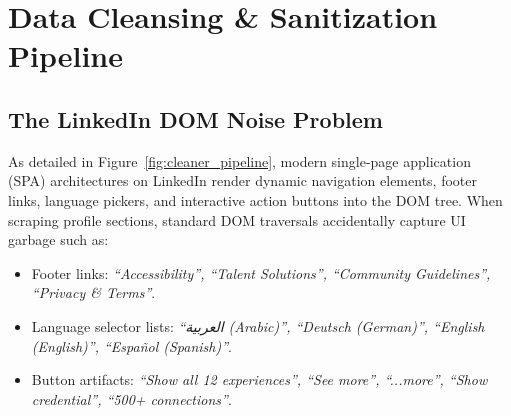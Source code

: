 \documentclass[11pt,a4paper]{report}
\begin{document}
\chapter{Data Cleansing \& Sanitization Pipeline}

\section{The LinkedIn DOM Noise Problem}
As detailed in Figure~\ref{fig:cleaner_pipeline}, modern single-page application (SPA) architectures on LinkedIn render dynamic navigation elements, footer links, language pickers, and interactive action buttons into the DOM tree. When scraping profile sections, standard DOM traversals accidentally capture UI garbage such as:
\begin{itemize}[leftmargin=*]
    \item Footer links: \textit{``Accessibility'', ``Talent Solutions'', ``Community Guidelines'', ``Privacy \& Terms''}.
    \item Language selector lists: \textit{``العربية (Arabic)'', ``Deutsch (German)'', ``English (English)'', ``Español (Spanish)''}.
    \item Button artifacts: \textit{``Show all 12 experiences'', ``See more'', ``...more'', ``Show credential'', ``500+ connections''}.
\end{itemize}
\end{document}
